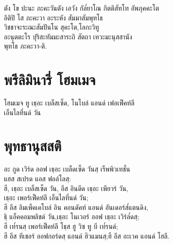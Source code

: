 \begin{leader}
\end{leader}

ตัง โข ปะนะ ภะคะวันตัง เอวัง กัล๎ยาโณ กิตติสัทโท อัพภุคคะโต\\
อิติปิ โส ภะคะวา อะระหัง สัมมาสัมพุทโธ\\
วิชชาจะระณะสัมปันโน สุคะโต,โลกะวิทู\\
อะนุตตะโร ปุริสะทัมมะสาระถิ สัตถา เทวะมะนุสสานัง\\
\vin พุทโธ ภะคะวา-ติ.\\
\clearpage

\chapter{พรีลิมินารี่ โฮมเมจ}

\begin{leader}
\end{leader}

\begin{thaitrans}
โฮมเมจ ทู เธฺอะ เบล็สเซ็ด, โนโบล์ แอนด์ เฟอเฟ็คท์ลี\\
เอ็นไลทึ่นด์ วัน\\
\end{thaitrans}

\chapter{พุทธานุสสติ}

\begin{leader}
\end{leader}

\begin{thaitrans}
อะ กูด เวิร์ด ออฟ เธฺอะ เบล็ดเซ็ด วันสฺ เร็พพิวเทชั่น\\
\vin แฮส สเปรด แอส ฟอล์โลสฺ:\\
ฮี, เธฺอะ เบล็สเซ็ด วัน, อีส อินดีด เธฺอะ เพียวร์ วัน,\\
\vin เธฺอะ เพอร์เฟ็คท์ลี เอ็นไลทึ่นด์ วัน;\\
ฮี อีส อิมเพ็คเคโบล์ อิน คอนดัคท์ แอนด์ อันเดอร์ส๎แตนดิง,\\
\vin ธฺิ แอ็คคอมพลิชด์ วัน,เธฺอะ โนเวอร์ ออฟ เธฺอะ เวิร์ล๎ดสฺ;\\
ฮี เท๎รนสฺ เพอร์เฟ็คท์ลี โธฺส ฮู วิซ ทู บี เท๎รนด์;\\
\vin ฮี อีส ทีเชอร์ ออฟกอร์ดสฺ แอนด์ ฮิวแมนสฺ;ฮี อีส อะเวค แอนด์ โฮลี.\\
\end{thaitrans}
\clearpage

